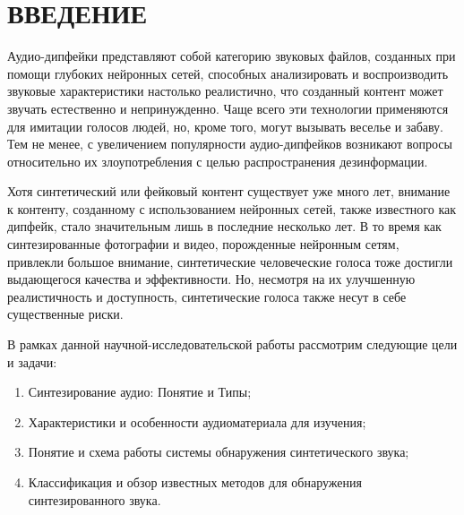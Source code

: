\part*{ВВЕДЕНИЕ}

Аудио-дипфейки представляют собой категорию звуковых файлов, созданных при помощи глубоких нейронных сетей, способных анализировать и воспроизводить звуковые характеристики настолько реалистично, что созданный контент может звучать естественно и непринужденно. Чаще всего эти технологии применяются для имитации голосов людей, но, кроме того, могут вызывать веселье и забаву. Тем не менее, с увеличением популярности аудио-дипфейков возникают вопросы относительно их злоупотребления с целью распространения дезинформации.

Хотя синтетический или фейковый контент существует уже много лет, внимание к контенту, созданному с использованием нейронных сетей, также известного как дипфейк, стало значительным лишь в последние несколько лет. В то время как синтезированные фотографии и видео, порожденные нейронным сетям, привлекли большое внимание, синтетические человеческие голоса тоже достигли выдающегося качества и эффективности. Но, несмотря на их улучшенную реалистичность и доступность, синтетические голоса также несут в себе существенные риски.

В рамках данной научной-исследовательской работы рассмотрим следующие цели и задачи:

\begin{enumerate}
    \item Синтезирование аудио: Понятие и Типы;
    \item Характеристики и особенности аудиоматериала для изучения;
    \item Понятие и схема работы системы обнаружения синтетического звука;
    \item Классификация и обзор известных методов для обнаружения синтезированного звука.
\end{enumerate}


